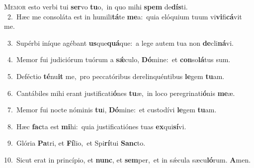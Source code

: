 \lettrine{\initial\textcolor{\initialcolor}{M}}{emor} esto verbi tui \textbf{ser}\-vo \textbf{tu}\-o,~\star in quo mihi \textbf{spem} de\-\textbf{dís}\-ti.\\
{\numbfont\textcolor{\numbcolor}{~2.}}~Hæc me consoláta est in humili\-\textbf{tá}\-te \textbf{me}\-a:~\star quia elóquium tuum vi\-\textbf{vi}\-fi\-\textbf{cá}\-vit me.\par
{\numbfont\textcolor{\numbcolor}{~3.}}~Supérbi iníque agébant \textbf{us}\-que\-\textbf{quá}\-que:~\star a lege autem tua non \textbf{de}\-cli\-\textbf{ná}\-vi.\par
{\numbfont\textcolor{\numbcolor}{~4.}}~Memor fui judiciórum tuórum a \textbf{sǽ}\-culo, \textbf{Dó}\-mine:~\star et \textbf{con}\-so\-\textbf{lá}\-tus sum.\par
{\numbfont\textcolor{\numbcolor}{~5.}}~Deféctio \textbf{té}\-nu\textbf{it} me,~\star pro peccatóribus derelinquéntibus \textbf{le}\-gem \textbf{tu}\-am.\par
{\numbfont\textcolor{\numbcolor}{~6.}}~Cantábiles mihi erant justificati\-\textbf{ó}\-nes \textbf{tu}\-æ,~\star in loco peregrinati\-\textbf{ó}\-nis \textbf{me}\-æ.\par
{\numbfont\textcolor{\numbcolor}{~7.}}~Memor fui nocte nóminis \textbf{tu}\-i, \textbf{Dó}\-mine:~\star et custodívi \textbf{le}\-gem \textbf{tu}\-am.\par
{\numbfont\textcolor{\numbcolor}{~8.}}~Hæc \textbf{fac}\-ta est \textbf{mi}\-hi:~\star quia justificatiónes tuas \textbf{ex}\-qui\-\textbf{sí}\-vi.\par
{\numbfont\textcolor{\numbcolor}{~9.}}~Glória \textbf{Pa}\-tri, et \textbf{Fí}\-lio,~\star et Spi\-\textbf{rí}\-tui \textbf{Sanc}\-to.\par
{\numbfont\textcolor{\numbcolor}{10.}}~Sicut erat in princípio, et \textbf{nunc}\-, et \textbf{sem}\-per,~\star et in sǽcula sæcu\-\textbf{ló}\-rum. \textbf{A}\-men.\par
